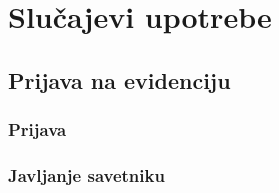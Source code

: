 \section{Slu\v cajevi upotrebe}

\subsection{Prijava na evidenciju}

\subsubsection{Prijava}

\subsubsection{Javljanje savetniku}